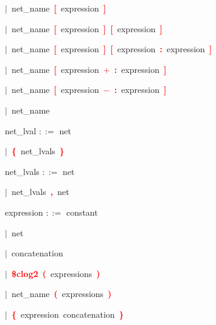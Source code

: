 \mbox{$|$ net\_name \textbf{\textcolor{red}{[}} expression \textbf{\textcolor{red}{]}}}

\mbox{$|$ net\_name \textbf{\textcolor{red}{[}} expression \textbf{\textcolor{red}{]}} \textbf{\textcolor{red}{[}} expression \textbf{\textcolor{red}{]}}}

\mbox{$|$ net\_name \textbf{\textcolor{red}{[}} expression \textbf{\textcolor{red}{]}} \textbf{\textcolor{red}{[}} expression \textbf{\textcolor{red}{:}} expression \textbf{\textcolor{red}{]}}}

\mbox{$|$ net\_name \textbf{\textcolor{red}{[}} expression \textbf{\textcolor{red}{$+$}} \textbf{\textcolor{red}{:}} expression \textbf{\textcolor{red}{]}}}

\mbox{$|$ net\_name \textbf{\textcolor{red}{[}} expression \textbf{\textcolor{red}{$-$}} \textbf{\textcolor{red}{:}} expression \textbf{\textcolor{red}{]}}}

\mbox{$|$ net\_name}

\vspace{1em}
\noindent
\settowidth{\parindent}{\hspace{4ex}}
net\_lval $::=$\hspace{1ex} net

\mbox{$|$ \textbf{\textcolor{red}{\textbf{\textcolor{red}{\{}}}} net\_lvals \textbf{\textcolor{red}{\textbf{\textcolor{red}{\}}}}}}

\vspace{1em}
\noindent
\settowidth{\parindent}{\hspace{4ex}}
net\_lvals $::=$\hspace{1ex} net

\mbox{$|$ net\_lvals \textbf{\textcolor{red}{,}} net}

\vspace{1em}
\noindent
\settowidth{\parindent}{\hspace{4ex}}
expression $::=$\hspace{1ex} constant

\mbox{$|$ net}

\mbox{$|$ concatenation}

\mbox{$|$ \textbf{\textcolor{red}{\textbf{\textcolor{red}{\$}}clog2}} \textbf{\textcolor{red}{(}} expressions \textbf{\textcolor{red}{)}}}

\mbox{$|$ net\_name \textbf{\textcolor{red}{(}} expressions \textbf{\textcolor{red}{)}}}

\mbox{$|$ \textbf{\textcolor{red}{\textbf{\textcolor{red}{\{}}}} expression concatenation \textbf{\textcolor{red}{\textbf{\textcolor{red}{\}}}}}}

